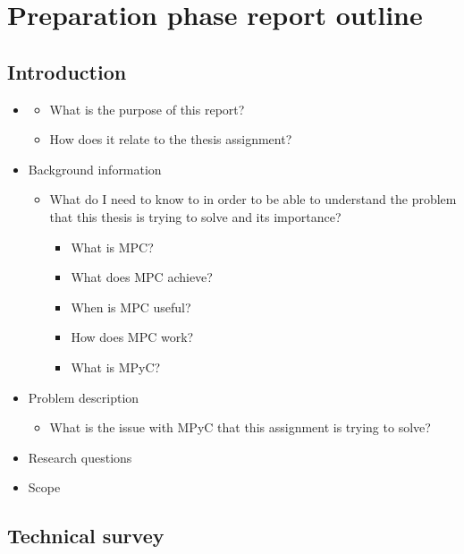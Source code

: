 \label{notes__05000-prep.md}
\chapter{Preparation phase report outline}\label{notes__05000-prep.md__preparation-phase-report-outline}

\section{Introduction}\label{notes__05000-prep.md__introduction}

\begin{itemize}
\tightlist
\item
  \begin{itemize}
  \tightlist
  \item
    What is the purpose of this report?
  \item
    How does it relate to the thesis assignment?
  \end{itemize}
\item
  Background information

  \begin{itemize}
  \tightlist
  \item
    What do I need to know to in order to be able to understand the problem that this thesis is trying to solve and its importance?

    \begin{itemize}
    \tightlist
    \item
      What is MPC?
    \item
      What does MPC achieve?
    \item
      When is MPC useful?
    \item
      How does MPC work?
    \item
      What is MPyC?
    \end{itemize}
  \end{itemize}
\item
  Problem description

  \begin{itemize}
  \tightlist
  \item
    What is the issue with MPyC that this assignment is trying to solve?
  \end{itemize}
\item
  Research questions
\item
  Scope
\end{itemize}

\section{Technical survey}\label{notes__05000-prep.md__technical-survey}

